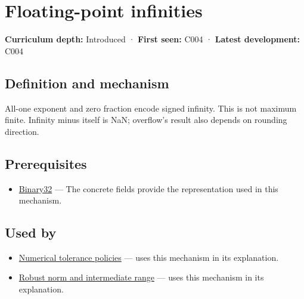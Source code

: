 \hypertarget{appendix-eb336149c00a}{}\label{referencestart:appendix-eb336149c00a}
\section{Floating-point infinities}\label{appendix-eb336149c00a-floating-point-infinities}

\hypertarget{appendix-eb336149c00a-floating-point-infinities}{}

\textbf{Curriculum depth:} Introduced · \textbf{First seen:} C004 · \textbf{Latest development:} C004

\begin{allmightroledefinition}

\subsection{Definition and mechanism}\label{appendix-eb336149c00a-definition-and-mechanism}

\hypertarget{appendix-eb336149c00a-definition-and-mechanism}{}

All-one exponent and zero fraction encode signed infinity. This is not maximum finite. Infinity minus itself is NaN; overflow's result also depends on rounding direction.

\end{allmightroledefinition}

\subsection{Prerequisites}\label{appendix-eb336149c00a-prerequisites}

\hypertarget{appendix-eb336149c00a-prerequisites}{}

\begin{itemize}
\tightlist
\item
  \hyperref[appendix-5057f9ad327f]{Binary32} --- The concrete fields provide the representation used in this mechanism.
\end{itemize}

\subsection{Used by}\label{appendix-eb336149c00a-used-by}

\hypertarget{appendix-eb336149c00a-used-by}{}

\begin{itemize}
\tightlist
\item
  \hyperref[appendix-0ec599f8ba27]{Numerical tolerance policies} --- uses this mechanism in its explanation.
\item
  \hyperref[appendix-7f1e17dcafb1]{Robust norm and intermediate range} --- uses this mechanism in its explanation.
\end{itemize}

